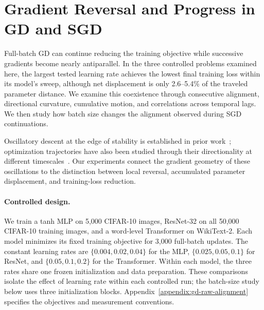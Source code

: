 
\section{Gradient Reversal and Progress in GD and SGD}
\label{sec:gd-experiments}

Full-batch GD can continue reducing the training objective while successive
gradients become nearly antiparallel. In the three controlled problems
examined here, the largest tested learning rate achieves the lowest final
training loss within its model's sweep, although net displacement is only
2.6--5.4\% of the traveled parameter distance. We examine this coexistence
through consecutive alignment, directional curvature, cumulative motion,
and correlations across temporal lags. We then study how batch size changes
the alignment observed during SGD continuations.

Oscillatory descent at the edge of stability is established in prior
work~\cite{cohen2021edge,damian2023selfstabilization}; optimization trajectories
have also been studied through their directionality at different
timescales~\cite{singh2025directionality}. Our experiments connect the
gradient geometry of these oscillations to the distinction between local
reversal, accumulated parameter displacement, and training-loss reduction.

\paragraph{Controlled design.}
We train a tanh MLP on 5,000 CIFAR-10 images, ResNet-32 on all 50,000
CIFAR-10 training images, and a word-level Transformer on WikiText-2.
Each model minimizes its fixed training objective for 3,000 full-batch
updates. The constant learning rates are $\{0.004,0.02,0.04\}$ for the MLP,
$\{0.025,0.05,0.1\}$ for ResNet, and $\{0.05,0.1,0.2\}$ for the Transformer.
Within each model, the three rates share one frozen initialization and
data preparation. These comparisons isolate the effect of learning rate
within each controlled run; the batch-size study below uses three
initialization blocks. Appendix~\ref{appendix:gd-raw-alignment} specifies
the objectives and measurement conventions.


